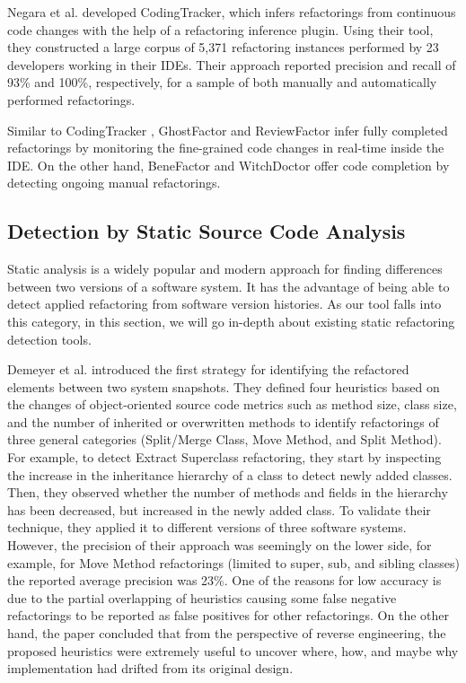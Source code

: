 \documentclass[letterpaper,12pt,onecolumn,final]{report}
\begin{document}
Negara et al. \cite{Negara2013} developed CodingTracker, which infers refactorings from continuous code changes with the help of a refactoring inference plugin. Using their tool, they constructed a large corpus of 5,371 refactoring instances performed by 23 developers working in their IDEs. Their approach reported precision and recall of 93\% and 100\%, respectively, for a sample of both manually and automatically performed refactorings.

Similar to CodingTracker \cite{Negara2013}, GhostFactor \cite{Ge2014} and ReviewFactor \cite{Ge2017} infer fully completed refactorings by monitoring the fine-grained code changes in real-time inside the IDE. On the other hand, BeneFactor \cite{Ge2012} and WitchDoctor \cite{Foster2012} offer code completion by detecting ongoing manual refactorings.

\subsection{Detection by Static Source Code Analysis}
Static analysis is a widely popular and modern approach for finding differences between two versions of a software system. It has the advantage of being able to detect applied refactoring from software version histories. As our tool falls into this category, in this section, we will go in-depth about existing static refactoring detection tools.

Demeyer et al. \cite{Demeyer2000} introduced the first strategy for identifying the refactored elements between two system snapshots. They defined four heuristics based on the changes of object-oriented source code metrics such as method size, class size, and the number of inherited or overwritten methods to identify refactorings of three general categories (Split/Merge Class, Move Method, and Split Method). For example, to detect Extract Superclass refactoring, they start by inspecting the increase in the inheritance hierarchy of a class to detect newly added classes. Then, they observed whether the number of methods and fields in the hierarchy has been decreased, but increased in the newly added class. To validate their technique, they applied it to different versions of three software systems. However, the precision of their approach was seemingly on the lower side, for example, for Move Method refactorings (limited to super, sub, and sibling classes) the reported average precision was 23\%. One of the reasons for low accuracy is due to the partial overlapping of heuristics causing some false negative refactorings to be reported as false positives for other refactorings. On the other hand, the paper concluded that from the perspective of reverse engineering, the proposed heuristics were extremely useful to uncover where, how, and maybe why implementation had drifted from its original design.
\end{document}
